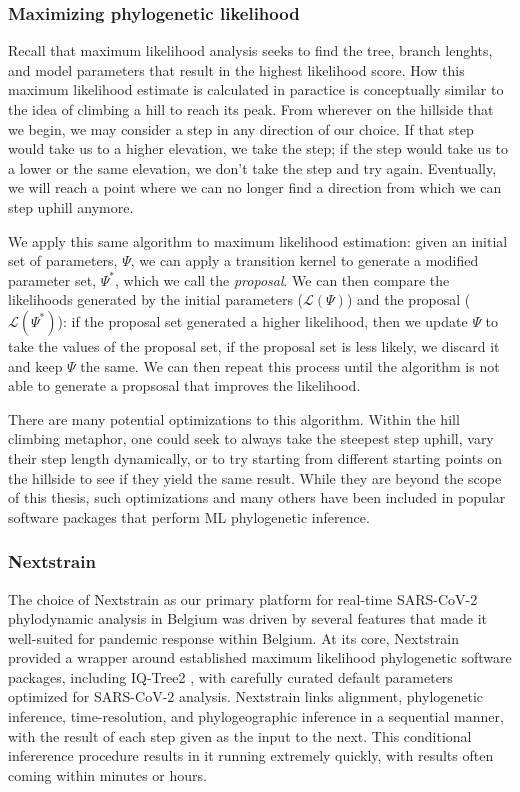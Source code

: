 \subsubsection{Maximizing phylogenetic likelihood}
Recall that maximum likelihood analysis seeks to find the tree, branch lenghts, and model parameters that result in the highest likelihood score.
How this maximum likelihood estimate is calculated in paractice is conceptually similar to the idea of climbing a hill to reach its peak.
From wherever on the hillside that we begin, we may consider a step in any direction of our choice.
If that step would take us to a higher elevation, we take the step; if the step would take us to a lower or the same elevation, we don't take the step and try again.
Eventually, we will reach a point where we can no longer find a direction from which we can step uphill anymore.

We apply this same algorithm to maximum likelihood estimation: given an initial set of parameters, $\Psi$, we can apply a transition kernel to generate a modified parameter set, $\Psi^*$, which we call the \textit{proposal}.
We can then compare the likelihoods generated by the initial parameters ($\mathcal{L}(\Psi)$) and the proposal ($\mathcal{L}(\Psi^*)$): if the proposal set generated a higher likelihood, then we update $\Psi$ to take the values of the proposal set, if the proposal set is less likely, we discard it and keep $\Psi$ the same.
We can then repeat this process until the algorithm is not able to generate a propsosal that improves the likelihood.

There are many potential optimizations to this algorithm.
Within the hill climbing metaphor, one could seek to always take the steepest step uphill, vary their step length dynamically, or to try starting from different starting points on the hillside to see if they yield the same result.
While they are beyond the scope of this thesis, such optimizations and many others have been included in popular software packages that perform ML phylogenetic inference.

\subsubsection{Nextstrain}
The choice of Nextstrain \citep{hadfield2018nextstrain} as our primary platform for real-time SARS-CoV-2 phylodynamic analysis in Belgium was driven by several features that made it well-suited for pandemic response within Belgium.
At its core, Nextstrain provided a wrapper around established maximum likelihood phylogenetic software packages, including IQ-Tree2 \citep{minh2020iq}, with carefully curated default parameters optimized for SARS-CoV-2 analysis.
Nextstrain links alignment, phylogenetic inference, time-resolution, and phylogeographic inference in a sequential manner, with the result of each step given as the input to the next.
This conditional infererence procedure results in it running extremely quickly, with results often coming within minutes or hours.

